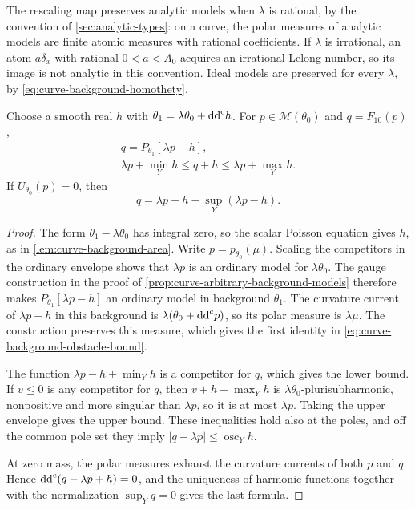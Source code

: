 The rescaling map preserves analytic models when $\lambda$ is rational, by the convention of \cref{sec:analytic-types}: on a curve, the polar measures of analytic models are finite atomic measures with rational coefficients. If $\lambda$ is irrational, an atom $a\delta_x$ with rational $0<a<A_0$ acquires an irrational Lelong number, so its image is not analytic in this convention. Ideal models are preserved for every $\lambda$, by \eqref{eq:curve-background-homothety}.

\begin{proposition}\label{prop:curve-background-obstacle-bound}
Choose a smooth real $h$ with $\theta_1=\lambda\theta_0+\mathrm{dd}^{\mathrm{c}} h$. For $p\in\mathcal M(\theta_0)$ and $q=F_{10}(p)$,
\begin{equation}\label{eq:curve-background-obstacle-bound}
 \begin{gathered}
 q=P_{\theta_1}[\lambda p-h],\\
 \lambda p+\min_Yh\leq q+h\leq\lambda p+\max_Yh.
 \end{gathered}
\end{equation}
If $U_{\theta_0}(p)=0$, then
\[
 q=\lambda p-h-\sup_Y(\lambda p-h).
\]
\end{proposition}
\begin{proof}
The form $\theta_1-\lambda\theta_0$ has integral zero, so the scalar Poisson equation gives $h$, as in \cref{lem:curve-background-area}. Write $p=p_{\theta_0}(\mu)$. Scaling the competitors in the ordinary envelope shows that $\lambda p$ is an ordinary model for $\lambda\theta_0$. The gauge construction in the proof of \cref{prop:curve-arbitrary-background-models} therefore makes $P_{\theta_1}[\lambda p-h]$ an ordinary model in background $\theta_1$. The curvature current of $\lambda p-h$ in this background is $\lambda(\theta_0+\mathrm{dd}^{\mathrm{c}} p)$, so its polar measure is $\lambda\mu$. The construction preserves this measure, which gives the first identity in \eqref{eq:curve-background-obstacle-bound}.

The function $\lambda p-h+\min_Yh$ is a competitor for $q$, which gives the lower bound. If $v\leq0$ is any competitor for $q$, then $v+h-\max_Yh$ is $\lambda\theta_0$-plurisubharmonic, nonpositive and more singular than $\lambda p$, so it is at most $\lambda p$. Taking the upper envelope gives the upper bound. These inequalities hold also at the poles, and off the common pole set they imply $|q-\lambda p|\leq\operatorname{osc}_Yh$.

At zero mass, the polar measures exhaust the curvature currents of both $p$ and $q$. Hence $\mathrm{dd}^{\mathrm{c}}(q-\lambda p+h)=0$, and the uniqueness of harmonic functions together with the normalization $\sup_Yq=0$ gives the last formula.
\end{proof}

